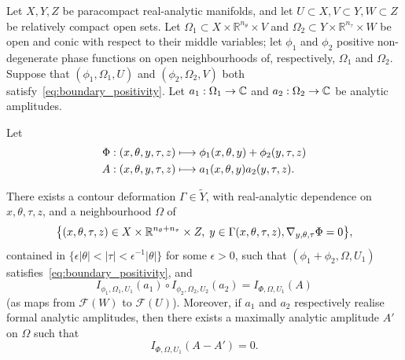 \documentclass[AHL,Unicode,longabstracts,published]{cedram}
\newcommand{\clF}{\mathcal{F}}
\newcommand\1{\mathds{1}}
\newcommand{\R}{\mathbb{R}}
\newcommand{\C}{\mathbb{C}}
\renewcommand*{\to}{\mathchoice{\longrightarrow}{\rightarrow}{\rightarrow}{\rightarrow}}
\let\oldmapsto\mapsto
\renewcommand*{\mapsto}{\mathchoice{\longmapsto}{\oldmapsto}{\oldmapsto}{\oldmapsto}}
\let\originalleft\left
\let\originalright\right
\renewcommand{\left}{\mathopen{}\mathclose\bgroup\originalleft}
\renewcommand{\right}{\aftergroup\egroup\originalright}
\begin{document}
\begin{prop}\label{prop:compo_well_def}
Let $X,Y,Z$ be paracompact
real-analytic manifolds, and let $U\subset X,V\subset Y,W\subset Z$ be relatively compact open sets. Let $\Omega_1\subset X\times \R^{n_{\theta}}\times V$ and $\Omega_2\subset Y\times \R^{n_{\tau}}\times W$ be open and conic with respect to their middle variables; let $\phi_1$ and $\phi_2$ positive non-degenerate phase functions on open neighbourhoods of, respectively, $\Omega_1$ and $\Omega_2$. Suppose that $(\phi_1,\Omega_1,U)$ and $(\phi_2,\Omega_2,V)$ both satisfy~\eqref{eq:boundary_positivity}. Let $a_1:\Omega_1\to \C$ and $a_2:\Omega_2\to \C$ be analytic amplitudes.

Let
\begin{align*}
\Phi:(x,\theta,y,\tau,z)&\mapsto
\phi_1(x,\theta,y)+\phi_2(y,\tau,z)
\\
A:(x,\theta,y,\tau,z)&\mapsto a_1(x,\theta,y)a_2(y,\tau,z).
\end{align*}

There exists a contour deformation $\Gamma\in \widetilde{Y}$, with real-analytic dependence on $x,\theta,\tau,z$, and a neighbourhood $\Omega$ of
\[
\left\{(x,\theta,\tau,z)\in X\times \R^{n_{\theta}+n_{\tau}}\times Z,\; y\in
\Gamma(x,\theta,\tau,z),\nabla_{y,\theta,\tau}\Phi=0\right\},
\]
contained in $\{\epsilon|\theta|<|\tau|<\epsilon^{-1}|\theta|\}$ for some $\epsilon>0$, such that $(\phi_1+\phi_2,\Omega,U_1)$ satisfies~\eqref{eq:boundary_positivity}, and
\[
I_{\phi_1,\Omega_1,U_1}(a_1)\circ I_{\phi_2,\Omega_2,U_2}(a_2)=I_{\Phi,\Omega,U_1}(A)
\]
(as maps from $\clF(W)$ to $\clF(U)$). Moreover, if $a_1$ and $a_2$ respectively realise formal analytic amplitudes, then there exists a maximally analytic amplitude $A'$ on $\Omega$ such that
\[
I_{\Phi,\Omega,U_1}(A-A')=0.
\]
\end{prop}
\end{document}
